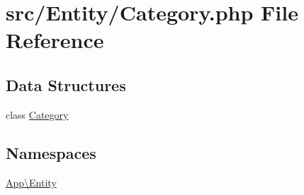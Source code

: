 \hypertarget{_category_8php}{}\section{src/\+Entity/\+Category.php File Reference}
\label{_category_8php}
\subsection*{Data Structures}
\begin{DoxyCompactItemize}
\item 
class \mbox{\hyperlink{class_app_1_1_entity_1_1_category}{Category}}
\end{DoxyCompactItemize}
\subsection*{Namespaces}
\begin{DoxyCompactItemize}
\item 
 \mbox{\hyperlink{namespace_app_1_1_entity}{App\textbackslash{}\+Entity}}
\end{DoxyCompactItemize}
